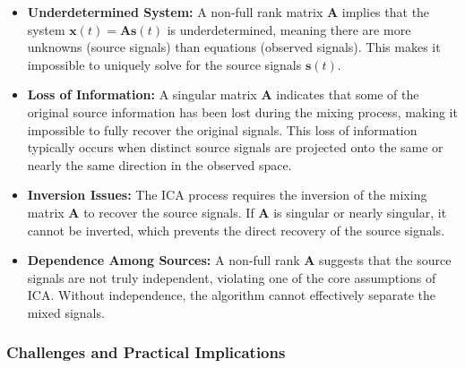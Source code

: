 \documentclass{exam}
\begin{document}
\begin{itemize}
    \item \textbf{Underdetermined System:} A non-full rank matrix \( \mathbf{A} \) implies that the system \( \mathbf{x}(t) = \mathbf{A} \mathbf{s}(t) \) is underdetermined, meaning there are more unknowns (source signals) than equations (observed signals). This makes it impossible to uniquely solve for the source signals \( \mathbf{s}(t) \).
    
    \item \textbf{Loss of Information:} A singular matrix \( \mathbf{A} \) indicates that some of the original source information has been lost during the mixing process, making it impossible to fully recover the original signals. This loss of information typically occurs when distinct source signals are projected onto the same or nearly the same direction in the observed space.
    
    \item \textbf{Inversion Issues:} The ICA process requires the inversion of the mixing matrix \( \mathbf{A} \) to recover the source signals. If \( \mathbf{A} \) is singular or nearly singular, it cannot be inverted, which prevents the direct recovery of the source signals.
    
    \item \textbf{Dependence Among Sources:} A non-full rank \( \mathbf{A} \) suggests that the source signals are not truly independent, violating one of the core assumptions of ICA. Without independence, the algorithm cannot effectively separate the mixed signals.
\end{itemize}

\subsubsection{Challenges and Practical Implications}
\end{document}
